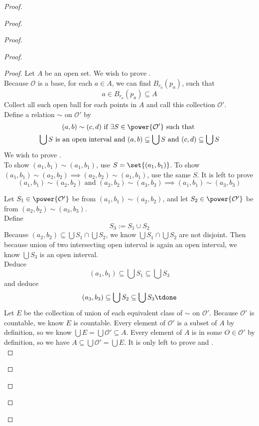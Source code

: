 \documentclass{report}
\begin{document}
\begin{proof}
\begin{proof}
\begin{proof}
\begin{proof}
\begin{proof}
Let $A$ be an open set. We wish to prove .\\


Because $\mathcal{O}$ is a base, for each $a\in A$, we can find $B_{r_a}(p_a)$, such that
\begin{equation}
a\in B_{r_a}(p_a)\subseteq A
\end{equation}
Collect all such open ball for each points in $A$ and call this collection  $\mathcal{O}'$.\\

Define a relation $\sim$ on $\mathcal{O}'$ by 
\begin{gather}
  (a,b)\sim (c,d) \text{ if }\exists S\in \power{\mathcal{O}'}\text{ such that }\\
  \bigcup S\text{ is an open interval and }(a,b)\subseteq\bigcup S\text{ and }(c,d)\subseteq \bigcup S
\end{gather}
We wish to prove .\\

To show $(a_1,b_1)\sim (a_1,b_1)$, use $S=\set{(a_1,b_1)}$. To show $(a_1,b_1)\sim (a_2,b_2)\implies (a_2,b_2)\sim (a_1,b_1)$, use the same $S$. It is left to prove
\begin{equation}
  (a_1,b_1)\sim (a_2,b_2)\text{ and }(a_2,b_2)\sim (a_3,b_3)\implies (a_1,b_1)\sim (a_3,b_3)
\end{equation}

Let $S_1\in \power{\mathcal{O}'}$ be from $(a_1,b_1)\sim (a_2,b_2)$, and let $S_2\in \power{\mathcal{O}'}$ be from $(a_2,b_2)\sim (a_3,b_3)$.\\

Define 
\begin{equation}
S_3:=S_1\cup S_2 
\end{equation}
Because $(a_2,b_2)\subseteq \bigcup S_1\cap \bigcup S_2$, we know $\bigcup S_1\cap \bigcup S_2$ are not disjoint. Then because union of two intersecting open interval is again an open interval, we know $\bigcup S_3$ is an open interval.\\

Deduce
\begin{equation}
  (a_1,b_1)\subseteq \bigcup S_1\subseteq \bigcup S_3
\end{equation}
and deduce
\begin{equation}
  (a_3,b_3)\subseteq \bigcup S_2\subseteq \bigcup S_3\tdone
\end{equation}
Let $E$ be the collection of union of each equivalent class of $\sim$ on $\mathcal{O}'$. Because $\mathcal{O}'$ is countable, we know $E$ is countable. Every element of $\mathcal{O}'$ is a subset of $A$ by definition, so we know  $\bigcup E=\bigcup \mathcal{O}'\subseteq A$. Every element of $A$ is in some  $O\in \mathcal{O}'$ by definition, so we have $A\subseteq \bigcup \mathcal{O}'=\bigcup E$. It is only left to prove  and .\\


\end{proof}
\end{proof}
\end{proof}
\end{proof}
\end{proof}
\end{document}
